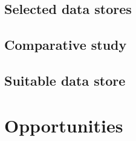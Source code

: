 \subsection{Selected data stores}
\label{sec:selected-data-stores}


\subsection{Comparative study}
\label{sec:comparative study}



\subsection{Suitable data store}
\label{sec:suitable-data-store}


\section{Opportunities}
\label{sec:opportunities}


